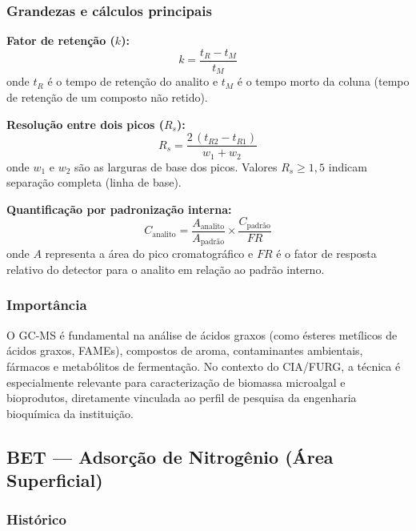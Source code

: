 \subsubsection*{Grandezas e cálculos principais}

\textbf{Fator de retenção ($k$):}
\begin{equation}
    k = \frac{t_R - t_M}{t_M}
\end{equation}
onde $t_R$ é o tempo de retenção do analito e $t_M$ é o tempo morto da
coluna (tempo de retenção de um composto não retido).

\textbf{Resolução entre dois picos ($R_s$):}
\begin{equation}
    R_s = \frac{2\,(t_{R2} - t_{R1})}{w_1 + w_2}
\end{equation}
onde $w_1$ e $w_2$ são as larguras de base dos picos. Valores $R_s \geq 1{,}5$
indicam separação completa (linha de base).

\textbf{Quantificação por padronização interna:}
\begin{equation}
    C_{\text{analito}} = \frac{A_{\text{analito}}}{A_{\text{padrão}}}
                          \times \frac{C_{\text{padrão}}}{FR}
\end{equation}
onde $A$ representa a área do pico cromatográfico e $FR$ é o fator de
resposta relativo do detector para o analito em relação ao padrão interno.

\subsubsection*{Importância}

O GC-MS é fundamental na análise de ácidos graxos (como ésteres metílicos
de ácidos graxos, FAMEs), compostos de aroma, contaminantes ambientais,
fármacos e metabólitos de fermentação. No contexto do CIA/FURG, a técnica
é especialmente relevante para caracterização de biomassa microalgal e
bioprodutos, diretamente vinculada ao perfil de pesquisa da engenharia
bioquímica da instituição.

\subsection{BET --- Adsorção de Nitrogênio (Área Superficial)}

\subsubsection*{Histórico}


